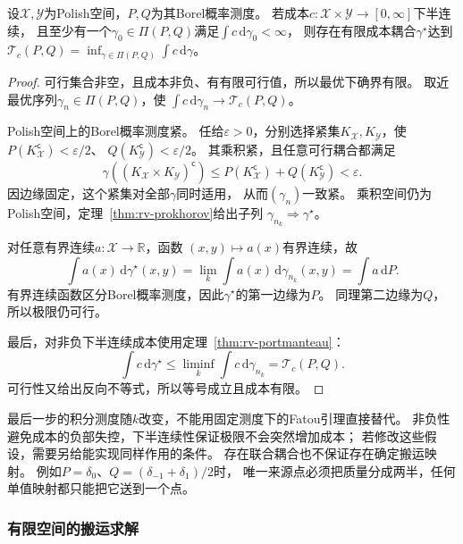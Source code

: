 \begin{theorem}[最优耦合存在]
\label{thm:information-optimal-coupling-existence}
设\(\mathcal X,\mathcal Y\)为Polish空间，\(P,Q\)为其Borel概率测度。
若成本\(c:\mathcal X\times\mathcal Y\to[0,\infty]\)下半连续，
且至少有一个\(\gamma_0\in\Pi(P,Q)\)满足\(\int c\,\mathrm d\gamma_0<\infty\)，
则存在有限成本耦合\(\gamma^\star\)达到
\(\mathcal T_c(P,Q)=\inf_{\gamma\in\Pi(P,Q)}\int c\,\mathrm d\gamma\)。
\end{theorem}
\begin{proof}
可行集合非空，且成本非负、有有限可行值，所以最优下确界有限。
取近最优序列\(\gamma_n\in\Pi(P,Q)\)，使
\(\int c\,\mathrm d\gamma_n\to\mathcal T_c(P,Q)\)。

Polish空间上的Borel概率测度紧。
任给\(\varepsilon>0\)，分别选择紧集\(K_{\mathcal X},K_{\mathcal Y}\)，使
\(P(K_{\mathcal X}^{\mathsf c})<\varepsilon/2\)、
\(Q(K_{\mathcal Y}^{\mathsf c})<\varepsilon/2\)。
其乘积紧，且任意可行耦合都满足
\[
  \gamma((K_{\mathcal X}\times K_{\mathcal Y})^{\mathsf c})
  \leq P(K_{\mathcal X}^{\mathsf c})+Q(K_{\mathcal Y}^{\mathsf c})
  <\varepsilon.
\]
因边缘固定，这个紧集对全部\(\gamma\)同时适用，
从而\((\gamma_n)\)一致紧。
乘积空间仍为Polish空间，定理~\ref{thm:rv-prokhorov}给出子列
\(\gamma_{n_k}\Rightarrow\gamma^\star\)。

对任意有界连续\(a:\mathcal X\to\mathbb R\)，函数
\((x,y)\mapsto a(x)\)有界连续，故
\[
  \int a(x)\,\mathrm d\gamma^\star(x,y)
  =\lim_k\int a(x)\,\mathrm d\gamma_{n_k}(x,y)=\int a\,\mathrm dP.
\]
有界连续函数区分Borel概率测度，因此\(\gamma^\star\)的第一边缘为\(P\)。
同理第二边缘为\(Q\)，所以极限仍可行。

最后，对非负下半连续成本使用定理~\ref{thm:rv-portmanteau}：
\[
  \int c\,\mathrm d\gamma^\star
  \leq\liminf_k\int c\,\mathrm d\gamma_{n_k}
  =\mathcal T_c(P,Q).
\]
可行性又给出反向不等式，所以等号成立且成本有限。
\end{proof}

最后一步的积分测度随\(k\)改变，不能用固定测度下的Fatou引理直接替代。
非负性避免成本的负部失控，下半连续性保证极限不会突然增加成本；
若修改这些假设，需要另给能实现同样作用的条件。
存在联合耦合也不保证存在确定搬运映射。
例如\(P=\delta_0\)、\(Q=(\delta_{-1}+\delta_1)/2\)时，
唯一来源点必须把质量分成两半，任何单值映射都只能把它送到一个点。

\subsubsection{有限空间的搬运求解}
\label{sec:information-finite-transport}

